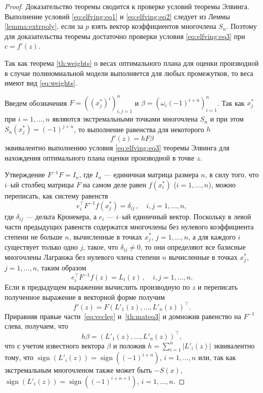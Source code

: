 \documentclass[specialist,
               substylefile = spbu.rtx,
               subf,href,colorlinks=true, 12pt]{disser}
\theoremstyle{definition}
\DeclareMathOperator*{\sign}{sign}
\newcommand\abs[1]{\left\lvert#1\right\rvert}
\begin{document}
	\begin{proof}
		Доказательство теоремы сводится к проверке условий теоремы Элвинга. Выполнение условий \eqref{eq:elfving:eq1} и \eqref{eq:elfving:eq2} следует из Леммы \ref{lemma:extrpoly}, если за $p$ взять вектор коэффициентов многочлена $S_n$. Поэтому для доказательства теоремы достаточно проверки условия \eqref{eq:elfving:eq3} при $c = f'(z)$.
	
	Так как теорема \ref{th:weights} о весах оптимального плана для оценки производной в случае полиномиальной модели выполняется для любых промежутков, то веса имеют вид \eqref{eq:weights}.
	
	Введем обозначения $F = \left((x_j^*)^i\right)^n_{i, j = 1}$ и $\beta = \left( \omega_i (-1)^{i+n} \right)_{i=1}^n$. Так как $x_j^*$ при $i = 1, \ldots , n$ являются экстремальными точками многочлена $S_n$ и при этом $S_n(x_j^*) = (-1)^{j+n}$, то выполнение равенства для некоторого $h$
	\begin{equation}
		\label{th:mateq3}
		f'(z) = hF\beta
	\end{equation}
	 эквивалентно выполнению условия \eqref{eq:elfving:eq3} теоремы Элвинга для нахождения оптимального плана оценки производной в точке $z$.
	 
	Утверждение $F^{-1}F = I_n$, где $I_n$ --- единичная матрица размера $n$, в силу того, что $i$--ый столбец матрицы $F$ на самом деле равен $f(x_i^*)$ ($i = 1, \ldots, n$), можно переписать, как систему равенств
	\begin{equation*}
		e_i^{\top} F^{-1} f(x_j^*) = \delta_{ij} \, , \quad i, j = 1, \ldots , n ,
	\end{equation*}
	где $\delta_{ij}$ --- дельта Кронекера, а $e_i$ --- $i$--ый единичный вектор. Поскольку в левой части предыдущих равенств содержатся многочлены без нулевого коэффициента степени не больше $n$, вычисленные в точках $x_j^*$, $j=1, \ldots , n$, а для каждого $i$ существует только одно $j$, такое, что $\delta_{ij} \neq 0$, то они определяют все базисные многочлены Лагранжа без нулевого члена степени $n$ вычисленные в точках $x_j^*$, $j=1, \ldots , n$, таким образом
	\begin{equation*}
		e_i^{\top} F^{-1} f(z) = L_i(z) \, , \quad i, j = 1, \ldots , n .
	\end{equation*}
	Если в предыдущем выражении вычислить производную по $z$ и переписать полученное выражение в векторной форме получим
	\begin{equation}
		\label{eq:vecleg}
		f'(z) = F \left( L'_1(z), \ldots, L'_n(z) \right)^\top.
	\end{equation}
	Приравняв правые части~\eqref{eq:vecleg} и~\eqref{th:mateq3} и домножив равенство на $F^{-1}$ слева, получаем, что
	\begin{equation*}
		h \beta = \left( L'_1(z), \ldots, L'_n(z) \right)^\top,
	\end{equation*}
	что с учетом известного вектора $\beta$ и положив $h = \sum_{i=1}^n \abs{L'_i(z)}$ эквивалентно тому, что $\sign (L'_i(z)) = \sign((-1)^{i+n}) $, $i = 1, \ldots, n$ или, так как экстремальным многочленом также может быть $-S(x)$,  $\sign (L'_i(z)) = \sign((-1)^{i+n+1}) $, $i = 1, \ldots, n$.
	

\end{proof}
\end{document}
